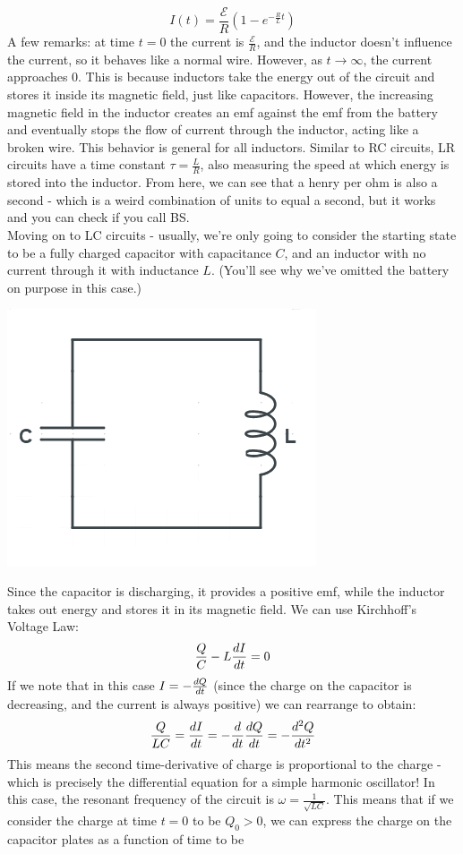 \[
	I(t) = \frac{\mathscr{E}}{R}(1 - e^{-\frac{R}{L}t})
\]
A few remarks: at time $t=0$ the current is $\frac{\mathscr{E}}{R}$, and the inductor doesn't influence the current, so it behaves like a normal wire. However, as $t \to \infty$, the current approaches $0$. This is because inductors take the energy out of the circuit and stores it inside its magnetic field, just like capacitors. However, the increasing magnetic field in the inductor creates an emf against the emf from the battery and eventually stops the flow of current through the inductor, acting like a broken wire. This behavior is general for all inductors. Similar to RC circuits, LR circuits have a time constant $\tau = \frac{L}{R}$, also measuring the speed at which energy is stored into the inductor. From here, we can see that a henry per ohm is also a second - which is a weird combination of units to equal a second, but it works and you can check if you call BS. \\
Moving on to LC circuits - usually, we're only going to consider the starting state to be a fully charged capacitor with capacitance $C$, and an inductor with no current through it with inductance $L$. (You'll see why we've omitted the battery on purpose in this case.) 
\begin{center}
	\includegraphics[scale=0.25]{images/em/LC-circuit.png}
\end{center}
Since the capacitor is discharging, it provides a positive emf, while the inductor takes out energy and stores it in its magnetic field. We can use Kirchhoff's Voltage Law:
\[
	\frac{Q}{C} - L \frac{d I}{d t} = 0
\]
If we note that in this case $I = -\frac{d Q}{d t}$ (since the charge on the capacitor is decreasing, and the current is always positive) we can rearrange to obtain:
\[
	\frac{Q}{LC} = \frac{d I}{d t} = -\frac{d }{d t} \frac{d Q}{d t} = -\frac{d^2 Q}{d t^2}
\]
This means the second time-derivative of charge is proportional to the charge - which is precisely the differential equation for a simple harmonic oscillator! In this case, the resonant frequency of the circuit is $\omega = \frac{1}{\sqrt{LC}}$. This means that if we consider the charge at time $t=0$ to be $Q_0 > 0$, we can express the charge on the capacitor plates as a function of time to be
